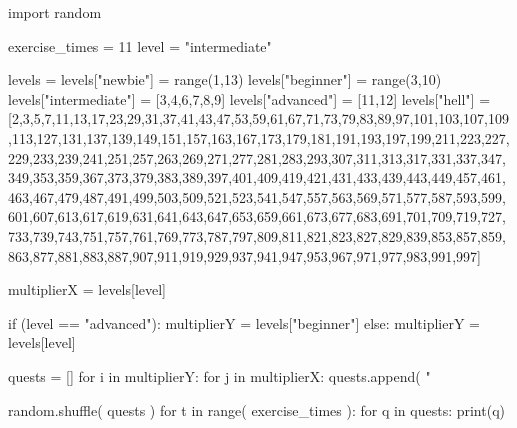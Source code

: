\documentclass{article}
\begin{document}
\begin{multicols}{6}

\large
{}
\noindent 
\begin{pycode}
import random

exercise_times = 11
level = "intermediate"

levels = {}
levels["newbie"] = range(1,13)
levels["beginner"] = range(3,10)
levels["intermediate"] = [3,4,6,7,8,9]
levels["advanced"] = [11,12]
levels["hell"] = [2,3,5,7,11,13,17,23,29,31,37,41,43,47,53,59,61,67,71,73,79,83,89,97,101,103,107,109,113,127,131,137,139,149,151,157,163,167,173,179,181,191,193,197,199,211,223,227,229,233,239,241,251,257,263,269,271,277,281,283,293,307,311,313,317,331,337,347,349,353,359,367,373,379,383,389,397,401,409,419,421,431,433,439,443,449,457,461,463,467,479,487,491,499,503,509,521,523,541,547,557,563,569,571,577,587,593,599,601,607,613,617,619,631,641,643,647,653,659,661,673,677,683,691,701,709,719,727,733,739,743,751,757,761,769,773,787,797,809,811,821,823,827,829,839,853,857,859,863,877,881,883,887,907,911,919,929,937,941,947,953,967,971,977,983,991,997]

multiplierX = levels[level]


if (level == "advanced"):
    multiplierY = levels["beginner"]
else:
    multiplierY = levels[level]

quests = []
for i in multiplierY:
    for j in multiplierX:
        quests.append( "%

random.shuffle( quests )
for t in range( exercise_times ):
    for q in quests:
        print(q)
    
\end{pycode}
\end{multicols}
\end{document}
